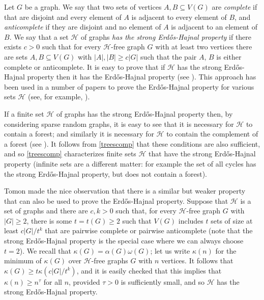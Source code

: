 \documentclass[titlepage,11pt]{article}
\begin{document}
Let $G$ be a graph.  We say that two sets of vertices $A,B\subseteq V(G)$ are {\em complete} if that are disjoint and 
every element of $A$ is adjacent to every element of $B$, and {\em anticomplete} if they are disjoint and no element of $A$ is 
adjacent to an element of $B$.
We say that a set $\mathcal{H}$ of graphs {\em has the strong Erd\H os-Hajnal property} if there exists $c>0$ such that for every $\mathcal H$-free graph $G$ with at least two vertices there are sets $A,B\subseteq V(G)$ with $|A|,|B|\geq c|G|$ such that the pair $A$, $B$ is either complete or anticomplete.
It is easy to prove that if $\mathcal H$
has the strong Erd\H os-Hajnal property then it has the Erd\H os-Hajnal property (see \cite{semialg,intersection}).  This
approach has been used in a number of papers  to prove the Erd\H os-Hajnal property for various sets $\mathcal H$ (see, for
example,  \cite{bonamy, lagoutte, hooks, pure1,pure2, liebenau}). 

If a finite set $\mathcal H$ of graphs has the strong Erd\H os-Hajnal property then, by considering sparse random graphs, it is easy to see that it is necessary for $\mathcal H$ to contain a forest; and similarly it is necessary for $\mathcal H$ to contain the complement of a forest (see \cite{pure1}).  It follows from \ref{treescomp} that these conditions are also sufficient, and so \ref{treescomp} characterizes finite sets $\mathcal H$ that have the strong Erd\H os-Hajnal property (infinite sets are a different matter: for example the set of all cycles has the strong Erd\H os-Hajnal property, but does not contain a forest).

Tomon \cite{tomon} made the nice observation that there is a similar but weaker property that can also be used to prove the 
Erd\H os-Hajnal property.  Suppose that $\mathcal H$ is a set of graphs and there are $c,k>0$ such that, for every $\mathcal H$-free 
graph $G$ with $|G|\ge 2$, there is some $t=t(G)\geq2$ such that $V(G)$ includes $t$ sets of size at least $c|G|/t^k$ that are pairwise complete 
or pairwise anticomplete (note that the  strong Erd\H os-Hajnal property is the special case where we can always choose
$t=2$).  
We recall that $\kappa(G)=\alpha(G)\omega(G)$; let us write $\kappa(n)$ for the minimum of $\kappa(G)$ over $\mathcal H$-free 
graphs $G$ with $n$ vertices.  It follows that
$\kappa(G)\ge t \kappa(c|G|/t^k)$, and it is easily checked that this implies that $\kappa(n)\ge n^\tau$ for all $n$, provided 
$\tau>0$ is sufficiently small, and so $\mathcal H$ has the strong Erd\H os-Hajnal property.
\end{document}
